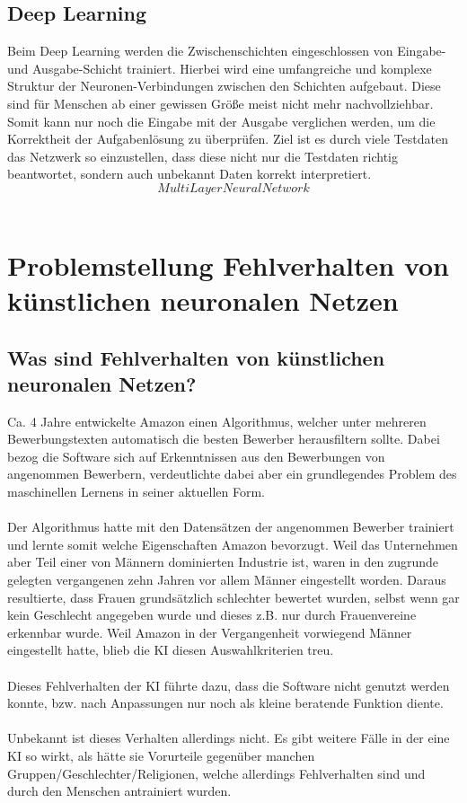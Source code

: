 \documentclass[12pt,oneside,a4paper,parskip]{scrbook}
\begin{document}
\section{Deep Learning}
Beim Deep Learning werden die Zwischenschichten eingeschlossen von Eingabe- und Ausgabe-Schicht trainiert. Hierbei wird eine umfangreiche und komplexe Struktur der Neuronen-Verbindungen zwischen den Schichten aufgebaut. Diese sind für Menschen ab einer gewissen Größe meist nicht mehr nachvollziehbar. Somit kann nur noch die Eingabe mit der Ausgabe verglichen werden, um die Korrektheit der Aufgabenlösung zu überprüfen. Ziel ist es durch viele Testdaten das Netzwerk so einzustellen, dass diese nicht nur die Testdaten richtig beantwortet, sondern auch unbekannt Daten korrekt interpretiert.
\\
\[MultiLayerNeuralNetwork\]
\\


\chapter{Problemstellung Fehlverhalten von künstlichen neuronalen Netzen}
\section{Was sind Fehlverhalten von künstlichen neuronalen Netzen?}
\label{section:KIBias}
Ca. 4 Jahre entwickelte Amazon einen Algorithmus, welcher unter mehreren Bewerbungstexten automatisch die besten Bewerber herausfiltern sollte. Dabei bezog die Software sich auf Erkenntnissen aus den Bewerbungen von angenommen Bewerbern, verdeutlichte dabei aber ein grundlegendes Problem des maschinellen Lernens in seiner aktuellen Form.\\\\
Der Algorithmus hatte mit den Datensätzen der angenommen Bewerber trainiert und lernte somit welche Eigenschaften Amazon bevorzugt. Weil das Unternehmen aber Teil einer von Männern dominierten Industrie ist, waren in den zugrunde gelegten vergangenen zehn Jahren vor allem Männer eingestellt worden. Daraus resultierte, dass Frauen grundsätzlich schlechter bewertet wurden, selbst wenn gar kein Geschlecht angegeben wurde und dieses z.B. nur durch Frauenvereine erkennbar wurde. Weil Amazon in der Vergangenheit vorwiegend Männer eingestellt hatte, blieb die KI diesen Auswahlkriterien treu.\cite{amazon} \\\\
Dieses Fehlverhalten der KI führte dazu, dass die Software nicht genutzt werden konnte, bzw. nach Anpassungen nur noch als kleine beratende Funktion diente.
\\\\
Unbekannt ist dieses Verhalten allerdings nicht. Es gibt weitere Fälle in der eine KI so wirkt, als hätte sie Vorurteile gegenüber manchen Gruppen/Geschlechter/Religionen, welche allerdings Fehlverhalten sind und durch den Menschen antrainiert wurden.
\end{document}
